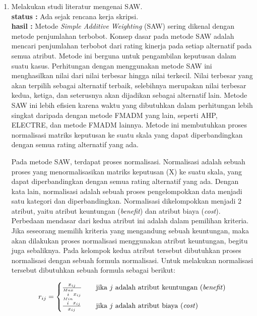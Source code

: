\documentclass[a4paper,twoside]{article}
\begin{document}
\begin{enumerate}
		\item Melakukan studi literatur mengenai SAW.\\
		{\bf status :} Ada sejak rencana kerja skripsi.\\
		{\bf hasil :} Metode \textit{Simple Additive Weighting} (SAW) sering dikenal dengan metode penjumlahan terbobot. Konsep dasar pada metode SAW adalah mencari penjumlahan terbobot dari rating kinerja pada setiap alternatif pada semua atribut. Metode ini berguna untuk pengambilan keputusan dalam suatu kasus. Perhitungan dengan menggunakan metode SAW ini menghasilkan nilai dari nilai terbesar hingga nilai terkecil. Nilai terbesar yang akan terpilih sebagai alternatif terbaik, selebihnya merupakan nilai terbesar kedua, ketiga, dan seterusnya akan dijadikan sebagai alternatif lain. Metode SAW ini lebih efisien karena waktu yang dibutuhkan dalam perhitungan lebih singkat daripada dengan metode FMADM yang lain, seperti AHP, ELECTRE, dan metode FMADM lainnya. Metode ini membutuhkan proses normalisasi matriks keputusan ke suatu skala yang dapat diperbandingkan dengan semua rating alternatif yang ada. %

Pada metode SAW, terdapat proses normalisasi. Normalisasi adalah sebuah proses yang menormalisasikan matriks keputusan (X) ke suatu skala, yang dapat diperbandingkan dengan semua rating alternatif yang ada. Dengan kata lain, normalisasi adalah sebuah proses pengelompokkan data menjadi satu kategori dan diperbandingkan. Normalisasi dikelompokkan menjadi 2 atribut, yaitu atribut keuntungan (\textit{benefit}) dan atribut biaya (\textit{cost}). Perbedaan mendasar dari kedua atribut ini adalah dalam pemilihan kriteria. Jika seseorang memilih kriteria yang mengandung sebuah keuntungan, maka akan dilakukan proses normalisasi menggunakan atribut keuntungan, begitu juga sebaliknya. Pada kelompok kedua atribut tersebut dibutuhkan proses normalisasi dengan sebuah formula normalisasi.  Untuk melakukan normalisasi tersebut dibutuhkan sebuah formula sebagai berikut:


\[ r_{ij}  =
  \begin{cases}
    \frac{x_{ij}}{\stackrel{Max}{i} x_{ij}}      & \quad \text{jika } j \text{ adalah atribut keuntungan (\textit{benefit})}\\
		
		
  \frac{\stackrel{Min}{i} x_{ij}} {x_{ij}}     & \quad \text{jika } j \text{ adalah atribut biaya (\textit{cost})}\\
  \end{cases}
\]


\end{enumerate}
\end{document}
